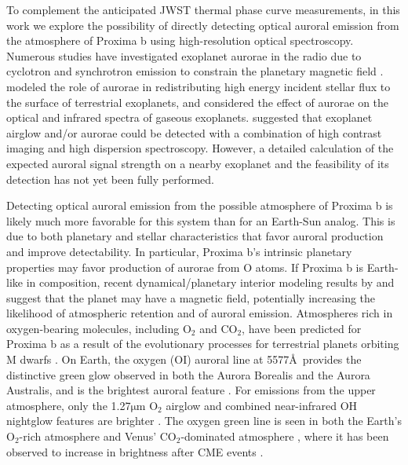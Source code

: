 \documentclass{emulateapj}
\begin{document}
To complement the anticipated JWST thermal phase curve measurements, in this work we explore the possibility of directly detecting optical auroral emission from the atmosphere of Proxima b using high-resolution optical spectroscopy. Numerous studies have investigated exoplanet aurorae in the radio due to cyclotron and synchrotron emission to constrain the planetary magnetic field \citep[e.g.][]{Bastian2000,Grie2007,Zarka2007,Hess2011,Driscoll2011}. \citet{Smith2004} modeled the role of aurorae in redistributing high energy incident stellar flux to the surface of terrestrial exoplanets, and \citet{Rimmer2015} considered the effect of aurorae on the optical and infrared spectra of gaseous exoplanets. \citet{SparksFord2002} suggested that exoplanet airglow and/or aurorae could be detected with a combination of high contrast imaging and high dispersion spectroscopy. However, a detailed calculation of the expected auroral signal strength on a nearby exoplanet and the feasibility of its detection has not yet been fully performed.

Detecting optical auroral emission from the possible atmosphere of Proxima b is likely much more favorable for this system than for an Earth-Sun analog. This is due to both planetary and stellar characteristics that favor auroral production and improve detectability. In particular, Proxima b's intrinsic planetary properties may favor production of aurorae from O atoms. If Proxima b is Earth-like in composition, recent dynamical/planetary interior modeling results by \citet{Barnes2016} and \citet{Zuluaga2016} suggest that the planet may have a magnetic field, potentially increasing the likelihood of atmospheric retention and of auroral emission. Atmospheres rich in oxygen-bearing molecules, including O$_2$ and CO$_2$, have been predicted for Proxima b \citep{Meadows2016} as a result of the evolutionary processes for terrestrial planets orbiting M dwarfs \citep{LugerBarnes2015,Barnes2016}. On Earth, the oxygen (OI) auroral line at 5577\AA\ provides the distinctive green glow observed in both the Aurora Borealis and the Aurora Australis, and is the brightest auroral feature \citep{Chamberlain1961, Dempsey2005}. For emissions from the upper atmosphere, only the 1.27$\mathrm{\mu}$m O$_2$ airglow and combined near-infrared OH nightglow features are brighter \citep{Hunten1967}. The oxygen green line is seen in both the Earth's O$_2$-rich atmosphere \citep{Chamberlain1961} and Venus' CO$_2$-dominated atmosphere \citep{Slanger2001}, where it has been observed to increase in brightness after CME events \citep{Gray2014}.
\end{document}

